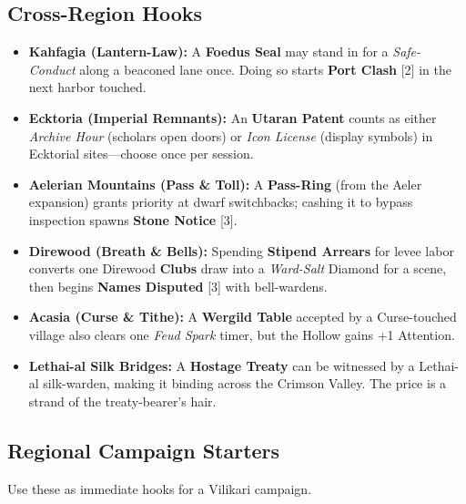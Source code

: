 \subsection{Cross-Region Hooks}

\begin{itemize}[nosep]
  \item \textbf{Kahfagia (Lantern-Law):} A \textbf{Foedus Seal} may stand in for a \emph{Safe-Conduct} along a beaconed lane once. Doing so starts \textbf{Port Clash} [2] in the next harbor touched.
  \item \textbf{Ecktoria (Imperial Remnants):} An \textbf{Utaran Patent} counts as either \emph{Archive Hour} (scholars open doors) or \emph{Icon License} (display symbols) in Ecktorial sites---choose once per session.
  \item \textbf{Aelerian Mountains (Pass \& Toll):} A \textbf{Pass-Ring} (from the Aeler expansion) grants priority at dwarf switchbacks; cashing it to bypass inspection spawns \textbf{Stone Notice} [3].
  \item \textbf{Direwood (Breath \& Bells):} Spending \textbf{Stipend Arrears} for levee labor converts one Direwood \textbf{Clubs} draw into a \emph{Ward-Salt} Diamond for a scene, then begins \textbf{Names Disputed} [3] with bell-wardens.
  \item \textbf{Acasia (Curse \& Tithe):} A \textbf{Wergild Table} accepted by a Curse-touched village also clears one \emph{Feud Spark} timer, but the Hollow gains +1 Attention.
  \item \textbf{Lethai-al Silk Bridges:} A \textbf{Hostage Treaty} can be witnessed by a Lethai-al silk-warden, making it binding across the Crimson Valley. The price is a strand of the treaty-bearer's hair.
\end{itemize}

\subsection{Regional Campaign Starters}
\label{sec:vilikari-starters}

Use these as immediate hooks for a Vilikari campaign.

